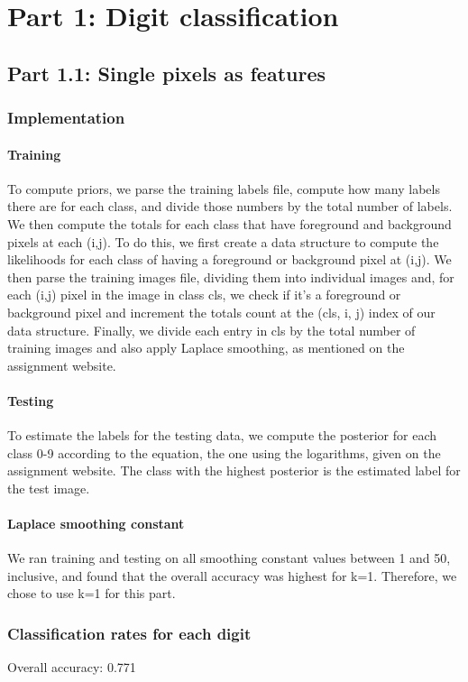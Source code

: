 \section{Part 1: Digit classification}
\subsection{Part 1.1: Single pixels as features}
\subsubsection{Implementation}
\paragraph{Training}
To compute priors, we parse the training labels file, compute how many labels there are for each class, and divide those numbers by the total number of labels. We then compute the totals for each class that have foreground and background pixels at each (i,j). To do this, we first create a data structure to compute the likelihoods for each class of having a foreground or background pixel at (i,j). We then parse the training images file, dividing them into individual images and, for each (i,j) pixel in the image in class cls, we check if it's a foreground or background pixel and increment the totals count at the (cls, i, j) index of our data structure. Finally, we divide each entry in cls by the total number of training images and also apply Laplace smoothing, as mentioned on the assignment website.

\paragraph{Testing}
To estimate the labels for the testing data, we compute the posterior for each class 0-9 according to the equation, the one using the logarithms, given on the assignment website. The class with the highest posterior is the estimated label for the test image.

\paragraph{Laplace smoothing constant}
We ran training and testing on all smoothing constant values between 1 and 50, inclusive, and found that the overall accuracy was highest for k=1. Therefore, we chose to use k=1 for this part.

\subsubsection{Classification rates for each digit}
Overall accuracy: 0.771

